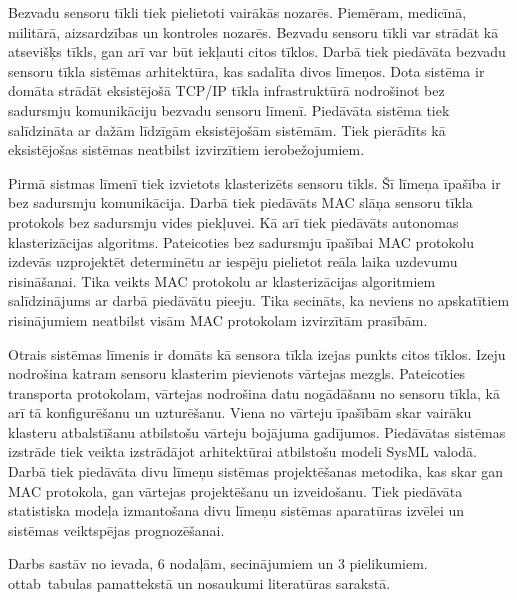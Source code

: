 ﻿Bezvadu sensoru tīkli tiek pielietoti vairākās nozarēs. Piemēram, medicīnā, militārā, aizsardzības un kontroles nozarēs. Bezvadu sensoru tīkli var strādāt kā atsevišķs tīkls, gan arī var būt iekļauti citos tīklos. Darbā tiek piedāvāta bezvadu sensoru tīkla sistēmas arhitektūra, kas sadalīta divos līmeņos. Dota sistēma ir domāta strādāt eksistējošā TCP/IP tīkla infrastruktūrā nodrošinot bez sadursmju komunikāciju bezvadu sensoru līmenī. Piedāvāta sistēma tiek salīdzināta ar dažām līdzīgām eksistējošām sistēmām. Tiek pierādīts kā eksistējošas sistēmas neatbilst izvirzītiem ierobežojumiem. 

Pirmā sistmas līmenī tiek izvietots klasterizēts sensoru tīkls. Šī līmeņa īpašība ir bez sadursmju komunikācija. Darbā tiek piedāvāts MAC slāņa sensoru tīkla protokols bez sadursmju vides piekļuvei. Kā arī tiek piedāvāts autonomas klasterizācijas algoritms. Pateicoties bez sadursmju īpašībai MAC protokolu izdevās uzprojektēt determinētu ar iespēju pielietot reāla laika uzdevumu risināšanai. Tika veikts MAC protokolu ar klasterizācijas algoritmiem salīdzinājums ar darbā piedāvātu pieeju. Tika secināts, ka neviens no apskatītiem risinājumiem neatbilst visām MAC protokolam izvirzītām prasībām. 

Otrais sistēmas līmenis ir domāts kā sensora tīkla izejas punkts citos tīklos. Izeju nodrošina katram sensoru klasterim pievienots vārtejas mezgls. Pateicoties transporta protokolam, vārtejas nodrošina datu nogādāšanu no sensoru tīkla, kā arī tā konfigurēšanu un uzturēšanu. Viena no vārteju īpašībām skar vairāku klasteru atbalstīšanu atbilstošu vārteju bojājuma gadījumos. Piedāvātas sistēmas izstrāde tiek veikta izstrādājot arhitektūrai atbilstošu modeli SysML valodā. Darbā tiek piedāvāta divu līmeņu sistēmas projektēšanas metodika, kas skar gan MAC protokola, gan vārtejas projektēšanu un izveidošanu. Tiek piedāvāta statistiska modeļa izmantošana divu līmeņu sistēmas aparatūras izvēlei un sistēmas veiktspējas prognozēšanai.

Darbs sastāv no ievada, 6 nodaļām, secinājumiem un 3 pielikumiem. ottab\ tabulas pamattekstā un  nosaukumi literatūras sarakstā.

